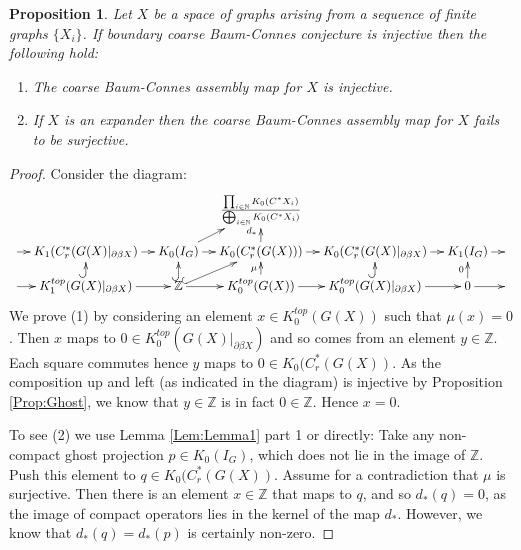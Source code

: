 \documentclass[11pt]{amsart}
\theoremstyle{plain}
\newtheorem{proposition}[theorem]{Proposition}%
\theoremstyle{definition}%
\theoremstyle{remark}%
\begin{document}
\begin{proposition}\label{Prop:Cor}
Let $X$ be a space of graphs arising from a sequence of finite graphs $\lbrace X_{i} \rbrace$. If  boundary coarse Baum-Connes conjecture is injective then the following hold:
\begin{enumerate}
\item The coarse Baum-Connes assembly map for $X$ is injective.
\item If $X$ is an expander then the coarse Baum-Connes assembly map for $X$ fails to be surjective.
\end{enumerate}
\end{proposition}
\begin{proof}
Consider the diagram:
$$
\xymatrix@=1em{& & & \frac{\prod_{i\in\mathbb{N}}K_{0}(C^{*}X_{i})}{\bigoplus_{i\in\mathbb{N}}K_{0}(C^{*}X_{i})}& & &\\
\ar[r] & K_{1}(C^{*}_{r}(G(X)|_{\partial\beta X}) \ar[r] & K_{0}(I_{G})\ar[ur] \ar[r]& K_{0}(C^{*}_{r}(G(X)))\ar[u]^{d_{*}} \ar[r]& K_{0}(C^{*}_{r}(G(X)|_{\partial\beta X})\ar[r] & K_{1}(I_{G}) \ar[r] & \\
\ar[r] & K_{1}^{top}(G(X)|_{\partial\beta X}) \ar[r] \ar@{^{(}->}[u]& \mathbb{Z} \ar@{^{(}->}[ur] \ar[r]\ar@{^{(}->}[u]& K_{0}^{top}(G(X)) \ar[r]\ar[u]^{\mu}& K_{0}^{top}(G(X)|_{\partial\beta X}) \ar[r]\ar@{^{(}->}[u]& 0\ar[u]^{0} \ar[r] & 
}
$$
We prove (1) by considering an element $x \in K_{0}^{top}(G(X))$ such that $\mu(x)=0$. Then $x$ maps to $0\in K_{0}^{top}(G(X)|_{\partial\beta X})$ and so comes from an element $y \in \mathbb{Z}$. Each square commutes hence $y$ maps to $0 \in K_{0}(C^{*}_{r}(G(X))$. As the composition up and left (as indicated in the diagram) is injective by Proposition \ref{Prop:Ghost}, we know that $y \in \mathbb{Z}$  is in fact $0 \in \mathbb{Z}$. Hence $x=0$.

To see (2) we use Lemma \ref{Lem:Lemma1} part 1 or directly: Take any non-compact ghost projection $p \in K_{0}(I_{G})$, which does not lie in the image of $\mathbb{Z}$. Push this element to $q \in K_{0}(C^{*}_{r}(G(X))$. Assume for a contradiction that $\mu$ is surjective. Then there is an element $x \in \mathbb{Z}$ that maps to $q$, and so $d_{*}(q)=0$, as the image of compact operators lies in the kernel of the map $d_{*}$. However, we know that $d_{*}(q)=d_{*}(p)$ is certainly non-zero.
\end{proof}
\end{document}
